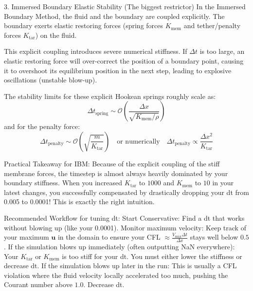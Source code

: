 \documentclass{article}
\begin{document}
3. Immersed Boundary Elastic Stability (The biggest restrictor)
In the Immersed Boundary Method, the fluid and the boundary are coupled explicitly. The boundary exerts elastic restoring forces (spring forces $K_{\text{mem}}$ and tether/penalty forces $K_{\text{tar}}$) on the fluid.

This explicit coupling introduces severe numerical stiffness. If $\Delta t$ is too large, an elastic restoring force will over-correct the position of a boundary point, causing it to overshoot its equilibrium position in the next step, leading to explosive oscillations (unstable blow-up).

The stability limits for these explicit Hookean springs roughly scale as: $$ \Delta t_{\text{spring}} \sim \mathcal{O}\left( \frac{\Delta x}{\sqrt{K_{\text{mem}} / \rho}} \right) $$ and for the penalty force: $$ \Delta t_{\text{penalty}} \sim \mathcal{O}\left( \sqrt{\frac{m}{K_{\text{tar}}}} \right) \quad \text{or numerically} \quad \Delta t_{\text{penalty}} \propto \frac{\Delta x^2}{K_{\text{tar}}} $$

Practical Takeaway for IBM: Because of the explicit coupling of the stiff membrane forces, the timestep is almost always heavily dominated by your boundary stiffness. When you increased $K_{\text{tar}}$ to $1000$ and $K_{\text{mem}}$ to $10$ in your latest changes, you successfully compensated by drastically dropping your dt from 0.005 to 0.0001! This is exactly the right intuition.

Recommended Workflow for tuning dt:
Start Conservative: Find a dt that works without blowing up (like your 0.0001).
Monitor maximum velocity: Keep track of your maximum $\mathbf{u}$ in the domain to ensure your CFL $\approx \frac{V_{\text{max}} \Delta t}{\Delta x}$ stays well below $0.5$.
If the simulation blows up immediately (often outputting NaN everywhere): Your $K_{\text{tar}}$ or $K_{\text{mem}}$ is too stiff for your dt. You must either lower the stiffness or decrease dt.
If the simulation blows up later in the run: This is usually a CFL violation where the fluid velocity locally accelerated too much, pushing the Courant number above $1.0$. Decrease dt.
\end{document}
